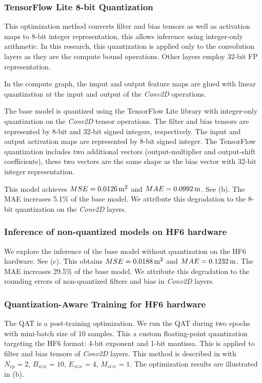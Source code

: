 \subsubsection{TensorFlow Lite 8-bit Quantization}
This optimization method converts filter and bias tensors as well as activation maps to 8-bit integer representation, this allows inference using integer-only arithmetic\cite{hannwindowsine}. In this research, this quantization is applied only to the convolution layers as they are the compute bound operations. Other layers employ 32-bit FP representation.

In the compute graph, the imput and output feature maps are glued with linear quantization at the input and output of the \emph{Conv2D} operations.

The base model is quantized using the TensorFlow Lite library with integer-only quantization on the \emph{Conv2D} tensor operations. The filter and bias tensors are represented by 8-bit and 32-bit signed integers, respectively. The input and output activation maps are represented by 8-bit signed integer. The TensorFlow quantization includes two additional vectors (output-multiplier and output-shift coefficients), these two vectors are the same shape as the bias vector with 32-bit integer representation.

This model achieves $MSE=\unit[0.0126]{m^2}$ and $MAE=\unit[0.0992]{m}$. See (b). The MAE increases 5.1\% of the base model. We attribute this degradation to the 8-bit quantization on the \emph{Conv2D} layers.

\subsubsection{Inference of non-quantized models on HF6 hardware}
We explore the inference of the base model without quantization on the HF6 hardware. See (c). This obtains $MSE=\unit[0.0188]{m^2}$ and $MAE=\unit[0.1232]{m}$. The MAE increases 29.5\% of the base model. We attribute this degradation to the rounding errors of non-quantized filters and bias in \emph{Conv2D} layers.

\subsubsection{Quantization-Aware Training for HF6 hardware}
The QAT is a post-training optimization. We run the QAT during two epochs with mini-batch size of 10 samples. This a custom floating-point quantization  targeting the HF6 format: 4-bit exponent and 1-bit mantissa. This is applied to filter and bias tensors of \emph{Conv2D} layers. This method is described in  with $N_{ep}=2$, $B_{size}=10$, $E_{size}=4$, $M_{size}=1$. The optimization results are illustrated in (b).

